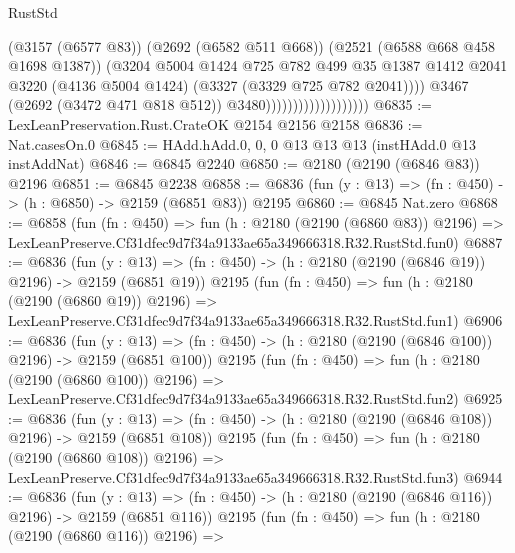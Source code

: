 \begin{lexlean}{RustStd}
\begin{coremodule}
                                            (@3157 (@6577 @83))
                                            (@2692 (@6582 @511 @668))
                                            (@2521 (@6588 @668 @458 @1698 @1387))
                                            (@3204
                                              @5004
                                              @1424
                                              @725
                                              @782
                                              @499
                                              @35
                                              @1387
                                              @1412
                                              @2041
                                              @3220
                                              (@4136 @5004 @1424)
                                              (@3327 (@3329 @725 @782 @2041))))
                                          @3467
                                          (@2692 (@3472 @471 @818 @512))
                                          @3480)))))))))))))))))))
@6835 := LexLeanPreservation.Rust.CrateOK @2154 @2156 @2158
@6836 := Nat.casesOn.{0}
@6845 := HAdd.hAdd.{0, 0, 0} @13 @13 @13 (instHAdd.{0} @13 instAddNat)
@6846 := @6845 @2240
@6850 := @2180 (@2190 (@6846 @83)) @2196
@6851 := @6845 @2238
@6858 := @6836 (fun (y : @13) => (fn : @450) -> (h : @6850) -> @2159 (@6851 @83)) @2195
@6860 := @6845 Nat.zero
@6868 := @6858
    (fun (fn : @450) =>
    fun (h : @2180 (@2190 (@6860 @83)) @2196) =>
    LexLeanPreserve.Cf31dfec9d7f34a9133ae65a349666318.R32.RustStd.fun0)
@6887 := @6836
    (fun (y : @13) => (fn : @450) -> (h : @2180 (@2190 (@6846 @19)) @2196) -> @2159 (@6851 @19))
    @2195
    (fun (fn : @450) =>
    fun (h : @2180 (@2190 (@6860 @19)) @2196) =>
    LexLeanPreserve.Cf31dfec9d7f34a9133ae65a349666318.R32.RustStd.fun1)
@6906 := @6836
    (fun (y : @13) => (fn : @450) -> (h : @2180 (@2190 (@6846 @100)) @2196) -> @2159 (@6851 @100))
    @2195
    (fun (fn : @450) =>
    fun (h : @2180 (@2190 (@6860 @100)) @2196) =>
    LexLeanPreserve.Cf31dfec9d7f34a9133ae65a349666318.R32.RustStd.fun2)
@6925 := @6836
    (fun (y : @13) => (fn : @450) -> (h : @2180 (@2190 (@6846 @108)) @2196) -> @2159 (@6851 @108))
    @2195
    (fun (fn : @450) =>
    fun (h : @2180 (@2190 (@6860 @108)) @2196) =>
    LexLeanPreserve.Cf31dfec9d7f34a9133ae65a349666318.R32.RustStd.fun3)
@6944 := @6836
    (fun (y : @13) => (fn : @450) -> (h : @2180 (@2190 (@6846 @116)) @2196) -> @2159 (@6851 @116))
    @2195
    (fun (fn : @450) =>
    fun (h : @2180 (@2190 (@6860 @116)) @2196) =>

\end{coremodule}
\end{lexlean}
